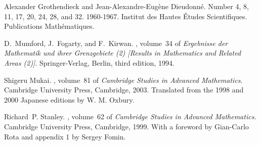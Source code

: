 % 
% 

\newpage
\begin{thebibliography}{MFK94}

Alexander Grothendieck and Jean-Alexandre-Eug\`ene Dieudonn\'e.
\newblock Number 4, 8, 11, 17, 20, 24, 28, and 32. 1960-1967.
\newblock Institut des Hautes \'Etudes Scientifiques. Publications
  Math\'ematiques.

D.~Mumford, J.~Fogarty, and F.~Kirwan.
, volume~34 of {\em Ergebnisse der
  Mathematik und ihrer Grenzgebiete (2) [Results in Mathematics and Related
  Areas (2)]}.
\newblock Springer-Verlag, Berlin, third edition, 1994.

Shigeru Mukai.
, volume~81 of {\em
  Cambridge Studies in Advanced Mathematics}.
\newblock Cambridge University Press, Cambridge, 2003.
\newblock Translated from the 1998 and 2000 Japanese editions by W. M. Oxbury.

Richard~P. Stanley.
, volume~62 of {\em
  Cambridge Studies in Advanced Mathematics}.
\newblock Cambridge University Press, Cambridge, 1999.
\newblock With a foreword by Gian-Carlo Rota and appendix 1 by Sergey Fomin.

\end{thebibliography}
